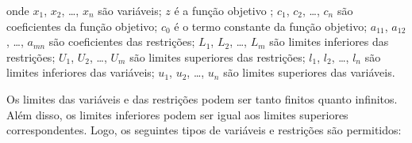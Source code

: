\documentclass[11pt, brazil]{report}
\begin{document}

\noindent
onde $x_1$, $x_2$, \dots, $x_n$ são variáveis; $z$ é a função objetivo
; $c_1$, $c_2$, \dots, $c_n$ são coeficientes da função objetivo; $c_0$
é o termo constante da função objetivo; $a_{11}$,		
$a_{12}$, \dots, $a_{mn}$ são coeficientes das restrições; $L_1$, $L_2$,
\dots, $L_m$ são limites inferiores das restrições; $U_1$, $U_2$, \dots, $U_m$
são limites superiores das restrições; $l_1$, $l_2$, \dots, $l_n$ são limites
inferiores das variáveis; $u_1$, $u_2$, \dots, $u_n$ são limites superiores das
variáveis.

Os limites das variáveis e das restrições podem ser tanto finitos quanto
infinitos. Além disso, os limites inferiores podem ser igual aos limites
superiores correspondentes. Logo, os seguintes tipos de variáveis e
restrições são permitidos:


%

\medskip
\end{document}
